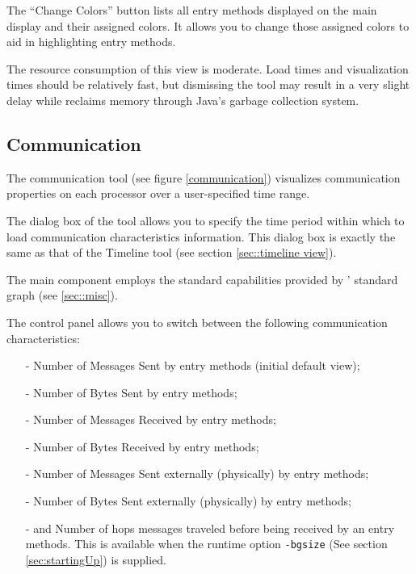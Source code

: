 \documentclass[10pt]{report}
\begin{document}
\begin{itemize}
The ``Change Colors'' button lists all entry methods displayed on the
main display and their assigned colors. It allows you to change those
assigned colors to aid in highlighting entry methods.

The resource consumption of this view is moderate. Load times and
visualization times should be relatively fast, but dismissing the tool
may result in a very slight delay while \projections{} reclaims memory
through Java's garbage collection system.

\end{itemize}

\subsection{Communication}
\label{sec::communication}

The communication tool (see figure \ref{communication}) visualizes
communication properties on each processor over a user-specified time
range.

The dialog box of the tool allows you to specify the time period
within which to load communication characteristics information. This
dialog box is exactly the same as that of the Timeline tool (see
section \ref{sec::timeline view}).

The main component employs the standard capabilities provided by
\projections{}' standard graph (see \ref{sec::misc}).

The control panel allows you to switch between the following
communication characteristics:

\begin{itemize}
\item[-] Number of Messages Sent by entry methods (initial default view);
\item[-] Number of Bytes Sent by entry methods;
\item[-] Number of Messages Received by entry methods;
\item[-] Number of Bytes Received by entry methods;
\item[-] Number of Messages Sent externally (physically) by entry methods;
\item[-] Number of Bytes Sent externally (physically) by entry methods;
\item[-] and Number of hops messages traveled before being received
by an entry methods. This is available when the runtime option {\tt -bgsize}
(See section \ref{sec:startingUp}) is supplied.
\end{itemize}
\end{document}
